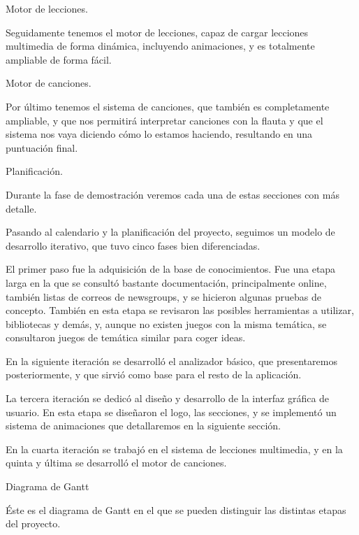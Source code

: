 \documentclass[landscape]{article}
\newenvironment{nota}
{%
\begin{framed} \noindent\itshape
}
{%
\end{framed}\vspace{-0.5cm} }
\begin{document}
\begin{multicols*}{2}
\begin{nota}
  Motor de lecciones.
\end{nota}

Seguidamente tenemos el motor de lecciones, capaz de cargar lecciones multimedia
de forma dinámica, incluyendo animaciones, y es totalmente ampliable de forma
fácil.

\begin{nota}
  Motor de canciones.
\end{nota}

Por último tenemos el sistema de canciones, que también es completamente
ampliable, y que nos permitirá interpretar canciones con la flauta y que el
sistema nos vaya diciendo cómo lo estamos haciendo, resultando en una puntuación
final.

\begin{nota}
  Planificación.
\end{nota}
Durante la fase de demostración veremos cada una de estas secciones con más detalle.

Pasando al calendario y la planificación del proyecto, seguimos un modelo de
desarrollo iterativo, que tuvo cinco fases bien diferenciadas.

 El primer paso fue la adquisición de la base de
conocimientos. Fue una etapa larga en la que se consultó bastante documentación,
principalmente online, también listas de correos de newsgroups, y se hicieron
algunas pruebas de concepto. También en esta etapa se revisaron las posibles
herramientas a utilizar, bibliotecas y demás, y, aunque no existen juegos con la
misma temática, se consultaron juegos de temática similar para coger ideas.

 En la siguiente iteración se desarrolló el analizador básico,
que presentaremos posteriormente, y que sirvió como base para el resto de la
aplicación.

 La tercera iteración se dedicó al diseño y desarrollo de la
interfaz gráfica de usuario. En esta etapa se diseñaron el logo, las secciones,
y se implementó un sistema de animaciones que detallaremos en la siguiente sección.

 En la cuarta iteración se trabajó en el sistema de lecciones
multimedia, y  en la quinta y última se desarrolló el motor de
canciones.

\begin{nota}
  Diagrama de Gantt
\end{nota}

Éste es el diagrama de Gantt en el que se pueden distinguir las distintas
etapas del proyecto.

\vfill \pagebreak


\end{multicols*}
\end{document}
